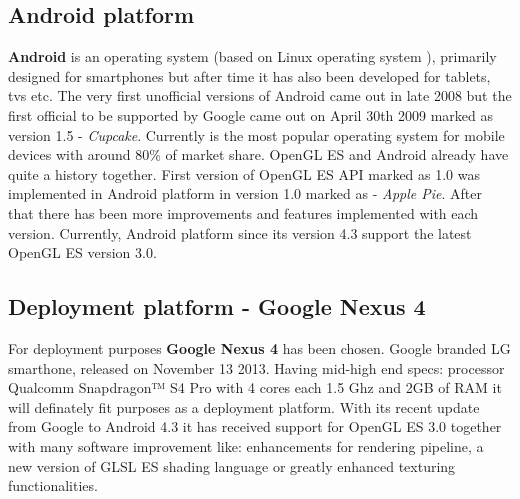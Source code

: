 \subsection{Android platform}
\textbf{Android} \cite{androidcom} is an operating system (based on Linux operating system \cite{gnulinux}), primarily designed for smartphones but after time it has also been developed for tablets, tvs etc.
The very first unofficial versions of Android came out in late 2008 but the first official to be supported by Google came out on April 30th 2009 marked as version 1.5 - \textit{Cupcake}.
\newline Currently is the most popular operating system for mobile devices with around 80\% of market share.
OpenGL ES and Android already have quite a history together.
First version of OpenGL ES API marked as 1.0 was implemented in Android platform in version 1.0 marked as - \textit{Apple Pie}.
After that there has been more improvements and features implemented with each version.
Currently, Android platform since its version 4.3 support the latest OpenGL ES version 3.0.

\subsection{Deployment platform - Google Nexus 4}
For deployment purposes \textbf{Google Nexus 4} has been chosen.
Google branded LG smarthone, released on November 13 2013.
\newline Having mid-high end specs: processor Qualcomm Snapdragon™ S4 Pro with 4 cores each 1.5 Ghz and 2GB of RAM it will definately fit purposes as a deployment platform.
\newline With its recent update from Google to Android 4.3 it has received support for OpenGL ES 3.0 together with many software improvement like: enhancements for rendering pipeline, a new version of GLSL ES shading language or greatly enhanced texturing functionalities.
